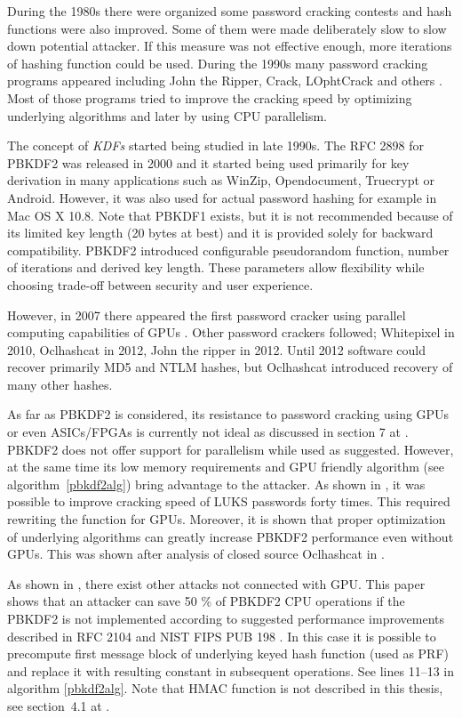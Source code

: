 \documentclass[nolof,digital]{fithesis3}
\begin{document}
During the 1980s there were organized some password cracking contests and hash functions were also improved. Some of them were made deliberately slow to slow down potential attacker. If this measure was not effective enough, more iterations of hashing function could be used. During the 1990s many password cracking programs appeared including John the Ripper, Crack, LOphtCrack and others \parencite{crackinghistory}. Most of those programs tried to improve the cracking speed by optimizing underlying algorithms and later by using CPU parallelism.

The concept of \emph{KDFs} started being studied in late 1990s. The RFC 2898 for PBKDF2 was released in 2000 and it started being used primarily for key derivation in many applications such as WinZip, Opendocument, Truecrypt or Android. However, it was also used for actual password hashing for example in Mac OS X 10.8. Note that PBKDF1 exists, but it is not recommended because of its limited key length (20 bytes at best) and it is provided solely for backward compatibility. PBKDF2 introduced configurable pseudorandom function, number of iterations and derived key length. These parameters allow flexibility while choosing trade-off between security and user experience.

However, in 2007 there appeared the first password cracker using parallel computing capabilities of GPUs \parencite{elcomsoftgpu}. Other password crackers followed; Whitepixel in 2010, Oclhashcat in 2012, John the ripper in 2012. Until 2012 software could recover primarily MD5 and NTLM hashes, but Oclhashcat introduced recovery of many other hashes.

As far as PBKDF2 is considered, its resistance to password cracking using GPUs or even ASICs/FPGAs is currently not ideal as discussed in section 7 at \parencite{mosnacek}. PBKDF2 does not offer support for parallelism while used as suggested. However, at the same time its low memory requirements and GPU friendly algorithm (see algorithm~\ref{pbkdf2alg}) bring advantage to the attacker. As shown in \parencite{mosnacek}, it was possible to improve cracking speed of LUKS passwords forty times. This required rewriting the function for GPUs. Moreover, it is shown that proper optimization of underlying algorithms can greatly increase PBKDF2 performance even without GPUs. This was shown after analysis of closed source Oclhashcat in \parencite{pbkdf2accel}.

As shown in \parencite{pbkdf2weakness}, there exist other attacks not connected with GPU. This paper shows that an attacker can save 50 \% of PBKDF2 CPU operations if the PBKDF2 is not implemented according to suggested performance improvements described in RFC 2104 \parencite{rfc2104} and NIST FIPS PUB 198 \parencite{fipspub198}. In this case it is possible to precompute first message block of underlying keyed hash function (used as PRF) and replace it with resulting constant in subsequent operations. See lines 11--13 in algorithm \ref{pbkdf2alg}. Note that HMAC function is not described in this thesis, see section~4.1 at \parencite{pbkdf2weakness}. 
\end{document}
